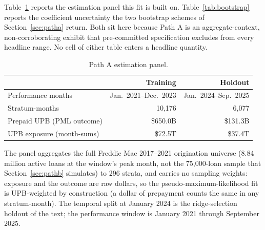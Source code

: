 \documentclass[12pt]{article}
\begin{document}
Table~\ref{tab:panel} reports the estimation panel this fit is built on. Table~\ref{tab:bootstrap} reports the coefficient uncertainty the two bootstrap schemes of Section~\ref{sec:patha} return. Both sit here because Path A is an aggregate-context, non-corroborating exhibit that pre-committed specification excludes from every headline range. No cell of either table enters a headline quantity.

\begin{table}[H]
\centering
\small
\begin{threeparttable}
\caption{Path A estimation panel.}
\label{tab:panel}
\begin{tabular}{@{}lrr@{}}
\toprule
 & Training & Holdout \\
\midrule
Performance months & Jan.\ 2021--Dec.\ 2023 & Jan.\ 2024--Sep.\ 2025 \\
Stratum-months & 10,176 & 6,077 \\
Prepaid UPB (PML outcome) & \$650.0B & \$131.3B \\
UPB exposure (month-sums) & \$72.5T & \$37.4T \\
\bottomrule
\end{tabular}
\begin{tablenotes}[flushleft]\footnotesize
\item The panel aggregates the full Freddie Mac 2017--2021 origination universe (8.84 million active loans at the window's peak month, not the 75,000-loan sample that Section~\ref{sec:pathb} simulates) to 296 strata, and carries no sampling weights: exposure and the outcome are raw dollars, so the pseudo-maximum-likelihood fit is UPB-weighted by construction (a dollar of prepayment counts the same in any stratum-month). The temporal split at January 2024 is the ridge-selection holdout of the text; the performance window is January 2021 through September 2025.
\end{tablenotes}
\end{threeparttable}
\end{table}
\end{document}
